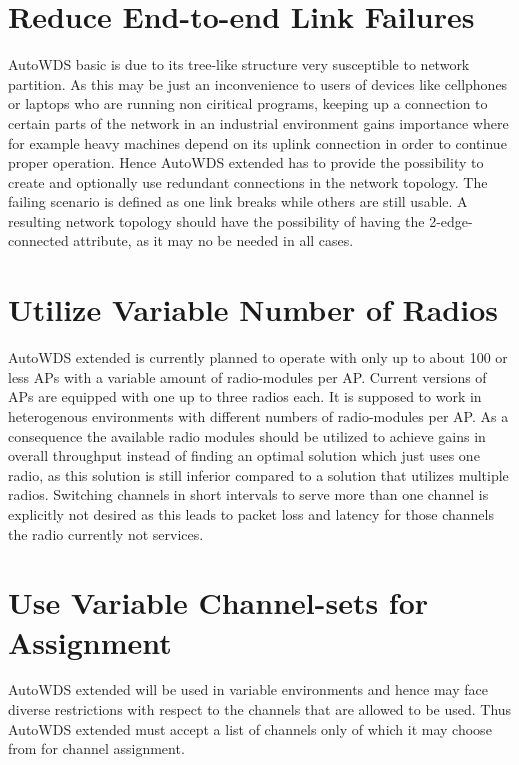   \section{Reduce End-to-end Link Failures}
  \label{regendtoend}
  AutoWDS basic is due to its tree-like structure very susceptible to network partition.
  As this may be just an inconvenience to users of devices like cellphones or laptops who are running non ciritical programs, 
  keeping up a connection to certain parts of the network in an industrial environment gains importance where for example heavy machines depend on its uplink connection in order 
  to continue proper operation. Hence AutoWDS extended has to provide the possibility to create and optionally use
  redundant connections in the network topology. The failing scenario is defined as one link breaks while others are still usable.
  A resulting network topology should have the possibility of having the 2-edge-connected attribute, as it may no be needed in all cases.
  
  \section{Utilize Variable Number of Radios}
  \label{utilvarnumradio}
  AutoWDS extended is currently planned to operate with only up to about 100 or less APs with a variable amount of radio-modules per \ac{AP}.
  Current versions of APs are equipped with one up to three radios each. It is supposed to work in heterogenous environments with 
  different numbers of radio-modules per \ac{AP}. As a consequence the available radio modules 
  should be utilized to achieve gains in overall throughput instead of finding an optimal solution which just uses one radio, as this solution is
  still inferior compared to a solution that utilizes multiple radios.
  Switching channels in short intervals to serve more than one channel is explicitly not desired as this leads to packet loss and latency for those channels the radio
  currently not services.
  
  \section{Use Variable Channel-sets for Assignment}
  AutoWDS extended will be used in variable environments and hence may face diverse restrictions with respect to the channels that are allowed to be used.
  Thus AutoWDS extended must accept a list of channels only of which it may choose from for channel assignment.
  

